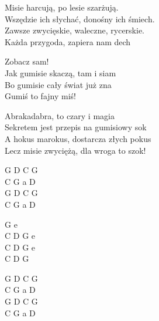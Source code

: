 \begin{text}
    Misie harcują, po lesie szarżują.\\
    Wszędzie ich słychać, donośny ich śmiech.\\
    Zawsze zwycięskie, waleczne, rycerskie.\\
    Każda przygoda, zapiera nam dech

    \vin Zobacz sam!\\
    \vin Jak gumisie skaczą, tam i siam\\
    \vin Bo gumisie cały świat już zna\\
    \vin Gumiś to fajny miś!

    Abrakadabra, to czary i magia\\
    Sekretem jest przepis na gumisiowy sok\\
    A hokus marokus, dostarcza złych pokus\\
    Lecz misie zwyciężą, dla wroga to szok!
\end{text}
\begin{chord}
    G D C G\\
    C G a D\\
    G D C G\\
    C G a D

    G e\\
	C D G e\\
    C D G e\\
    C D G

    G D C G\\
    C G a D\\
    G D C G\\
    C G a D
\end{chord}